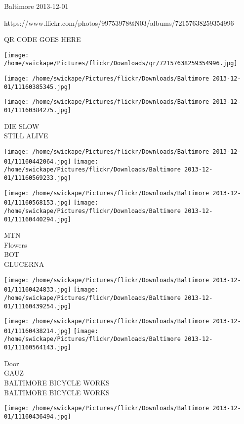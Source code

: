 \documentclass[10pt,letterpaper]{article}
\begin{document}
Baltimore 2013-12-01

https://www.flickr.com/photos/99753978@N03/albums/72157638259354996

QR CODE GOES HERE

\texttt{[image: /home/swickape/Pictures/flickr/Downloads/qr/72157638259354996.jpg]}
\pagebreak

\texttt{[image: /home/swickape/Pictures/flickr/Downloads/Baltimore 2013-12-01/11160385345.jpg]}

\vspace{0.25in}
\texttt{[image: /home/swickape/Pictures/flickr/Downloads/Baltimore 2013-12-01/11160384275.jpg]}

DIE SLOW\\
STILL ALIVE\\
\pagebreak

\texttt{[image: /home/swickape/Pictures/flickr/Downloads/Baltimore 2013-12-01/11160442064.jpg]}
\texttt{[image: /home/swickape/Pictures/flickr/Downloads/Baltimore 2013-12-01/11160569233.jpg]}

\texttt{[image: /home/swickape/Pictures/flickr/Downloads/Baltimore 2013-12-01/11160568153.jpg]}
\texttt{[image: /home/swickape/Pictures/flickr/Downloads/Baltimore 2013-12-01/11160440294.jpg]}

MTN\\
Flowers\\
BOT\\
GLUCERNA\\
\pagebreak

\texttt{[image: /home/swickape/Pictures/flickr/Downloads/Baltimore 2013-12-01/11160424833.jpg]}
\texttt{[image: /home/swickape/Pictures/flickr/Downloads/Baltimore 2013-12-01/11160439254.jpg]}

\texttt{[image: /home/swickape/Pictures/flickr/Downloads/Baltimore 2013-12-01/11160438214.jpg]}
\texttt{[image: /home/swickape/Pictures/flickr/Downloads/Baltimore 2013-12-01/11160564143.jpg]}

Door\\
GAUZ\\
BALTIMORE BICYCLE WORKS\\
BALTIMORE BICYCLE WORKS\\
\pagebreak

\texttt{[image: /home/swickape/Pictures/flickr/Downloads/Baltimore 2013-12-01/11160436494.jpg]}
\end{document}
